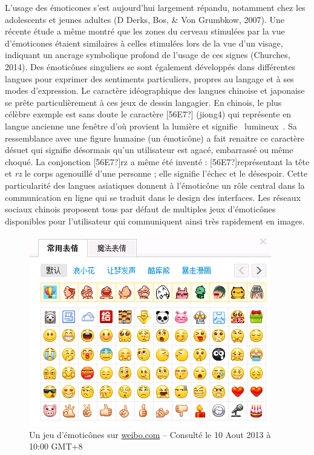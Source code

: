L{\textquoteright}usage des \'emoticones s{\textquoteright}est aujourd{\textquoteright}hui largement r\'epandu, notamment chez les adolescents et jeunes adultes (D Derks, Bos, \& Von Grumbkow, 2007). Une r\'ecente \'etude a m\^eme montr\'e que les zones du cerveau stimul\'ees par la vue d{\textquoteright}\'emoticones \'etaient similaires \`a celles stimul\'ees lors de la vue d{\textquoteright}un visage, indiquant un ancrage symbolique profond de l{\textquoteright}usage de ces signes (Churches, 2014). Des \'emotic\^ones singuliers se sont \'egalement d\'evelopp\'es dans diff\'erentes langues pour exprimer des sentiments particuliers, propres au langage et \`a ses modes d{\textquoteright}expression. Le caract\`ere id\'eographique des langues chinoise et japonaise se pr\^ete particuli\`erement \`a ces jeux de dessin langagier. En chinois, le plus c\'el\`ebre exemple est sans doute le caract\`ere [56E7?] (jiong4) qui repr\'esente en langue ancienne une fen\^etre d{\textquoteright}o\`u provient la lumi\`ere et signifie {\guillemotleft}~lumineux~{\guillemotright}. Sa ressemblance avec une figure humaine (un \'emotic\^one) a fait renaitre ce caract\`ere d\'esuet qui signifie d\'esormais qu{\textquoteright}un utilisateur est agac\'e, embarrass\'e ou m\^eme choqu\'e. La conjonction {\textquotedbl}[56E7?]rz{\textquotedbl} a m\^eme \'et\'e invent\'e : [56E7?]repr\'esentant la t\^ete et \textit{rz} le corps agenouill\'e d{\textquoteright}une personne ; elle signifie l{\textquoteright}\'echec et le d\'esespoir. Cette particularit\'e des langues asiatiques donnent \`a l{\textquoteright}\'emotic\^one un r\^ole central dans la communication en ligne qui se traduit dans le design des interfaces. Les r\'eseaux sociaux chinois proposent tous par d\'efaut de multiples jeux d{\textquoteright}\'emotic\^ones disponibles pour l{\textquoteright}utilisateur qui communiquent ainsi tr\`es rapidement en images.  

\begin{figure}[h]
    \centering
    \includegraphics[width=4.1669in,height=3.278in]{figures/chap2/chapitre2-img1.png}
    \caption[Un jeu d{\textquoteright}\'emotic\^ones de Weibo]{Un jeu d{\textquoteright}\'emotic\^ones sur \url{weibo.com} -- Consult\'e le 10 Aout 2013 \`a 10:00 GMT+8}
    \label{fig:emoticons-weibo}
\end{figure}


